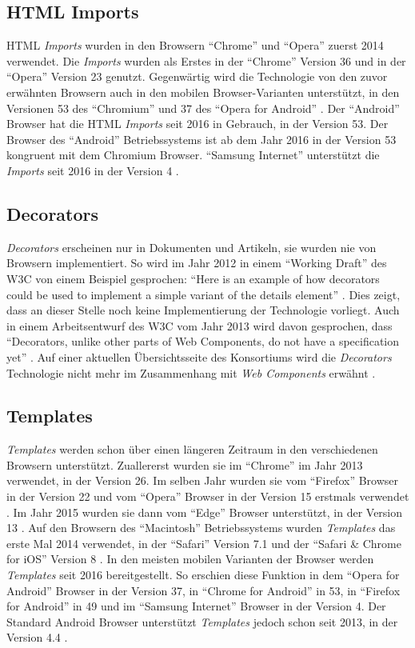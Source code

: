 \documentclass[12pt, paper=a4, bibtotoc, toc=listof, headsepline=true, numbers=endperiod]{scrreprt}
\begin{document}
		\subsection{HTML Imports}
		\ac{HTML} \emph{Imports} wurden in den Browsern \enquote{Chrome} und \enquote{Opera} zuerst 2014 verwendet. Die \emph{Imports} wurden als Erstes in der \enquote{Chrome} Version 36 und in der \enquote{Opera} Version 23 genutzt. Gegenwärtig wird die Technologie von den zuvor erwähnten Browsern auch in den mobilen Browser-Varianten unterstützt, in den Versionen 53 des \enquote{Chromium} und 37 des \enquote{Opera for Android} \cite{Morrita2015}. Der \enquote{Android} Browser hat die \ac{HTML} \emph{Imports} seit 2016 in Gebrauch, in der Version 53. Der Browser des \enquote{Android} Betriebssystems ist ab dem Jahr 2016 in der Version 53 kongruent mit dem Chromium Browser. \enquote{Samsung Internet} unterstützt die \emph{Imports} seit 2016 in der Version 4 \cite{htmlTemplCaniuse}.
		\subsection{Decorators}
		\label{sec:dec}
		\emph{Decorators} erscheinen nur in Dokumenten und Artikeln, sie wurden nie von Browsern implementiert. So wird im Jahr 2012 in einem \enquote{Working Draft} des \ac{W3C} von einem Beispiel gesprochen: \enquote{Here is an example of how decorators could be used to implement a simple variant of the details element} \cite{Cooney2012}. Dies zeigt, dass an dieser Stelle noch keine Implementierung der Technologie vorliegt. Auch in einem Arbeitsentwurf des \ac{W3C} vom Jahr 2013 wird davon gesprochen, dass \enquote{Decorators, unlike other parts of Web Components, do not have a specification yet} \cite{Cooney2013}.
		Auf einer aktuellen Übersichtsseite des Konsortiums wird die \emph{Decorators} Technologie nicht mehr im Zusammenhang mit \emph{Web Components} erwähnt \cite{WebComCur2016}.
		\subsection{Templates}
		\emph{Templates} werden schon über einen längeren Zeitraum in den verschiedenen Browsern unterstützt. Zuallererst wurden sie im \enquote{Chrome} im Jahr 2013 verwendet, in der Version 26. Im selben Jahr wurden sie vom \enquote{Firefox} Browser in der Version 22 und vom \enquote{Opera} Browser in der Version 15 erstmals verwendet \cite{W2015} \cite{htmlTemFire}.
		Im Jahr 2015 wurden sie dann vom \enquote{Edge} Browser unterstützt, in der Version 13 \cite{build10547}.
		Auf den Browsern des \enquote{Macintosh} Betriebssystems wurden \emph{Templates} das erste Mal 2014 verwendet, in der \enquote{Safari} Version 7.1 und der \enquote{Safari \& Chrome for iOS} Version 8 \cite{htmlTemplCaniuse}. In den meisten mobilen Varianten der Browser werden \emph{Templates} seit 2016 bereitgestellt. So erschien diese Funktion in dem \enquote{Opera for Android} Browser in der Version 37, in \enquote{Chrome for Android} in 53, in \enquote{Firefox for Android} in 49 und im \enquote{Samsung Internet} Browser in der Version 4. Der Standard Android Browser unterstützt \emph{Templates} jedoch schon seit 2013, in der Version 4.4 \cite{htmlTemplCaniuse}.
\end{document}
